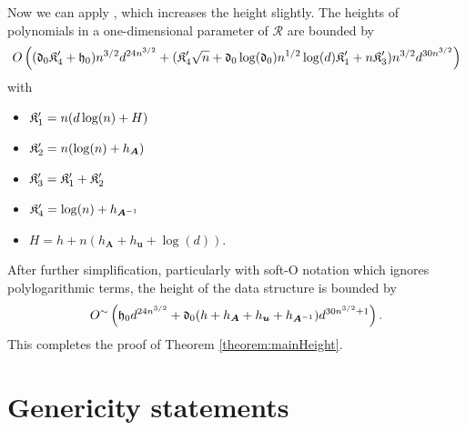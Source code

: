 \documentclass[12pt]{article}
\def\mA{{\bm A}}
\def\fK{\frak{K}}
\def\sR {\mathscr{R}}
\def\mA{{\bm A}}
\begin{document}
Now we can apply \cite[Theorem 1]{DAHAN2012109}, 
which increases the height slightly. The heights of polynomials in a one-dimensional parameter of $\sR$ are bounded by 
\[
O\left((\frak{d}_0\fK_4'+\frak{h}_0)n^{3/2}d^{24n^{3/2}} + (\fK_4'\sqrt{n}+\frak{d}_0\log(\frak{d}_0)n^{1/2}\log(d)\fK_1'+n\fK_3')n^{3/2}d^{30n^{3/2}}\right)
\]
    with
%
\begin{itemize}
    \item $\fK_1' = n(d\log(n)+H)$
    \item $\fK_2' = n(\log(n)+h_{\mA})$
    \item $\fK_3' = \fK_1'+\fK_2'$
    \item $\fK_4' = \log(n)+h_{\mA^{-1}}$
    \item $H = h + n(h_{\bm A} + h_{\bm u} + \log(d)).$
\end{itemize}
%
After further simplification, particularly with soft-O notation which ignores polylogarithmic terms, the height of the data structure is bounded by 
\[
O^{\sim}\left( \frak{h}_0d^{24n^{3/2}} + \frak{d}_0(h+h_{\mA}+h_{\bm u} + h_{\mA^{-1}})d^{30n^{3/2}+1}\right).
\]
This completes the proof of Theorem \ref{theorem:mainHeight}.








































\section{Genericity statements}

\end{document}
